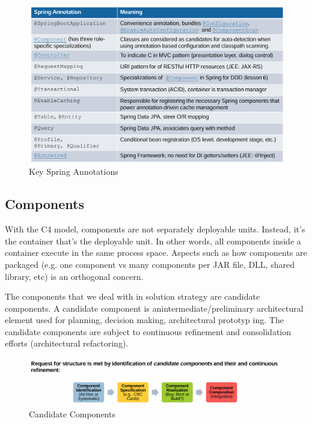 \documentclass[../Main.tex]{subfiles}
\begin{document}
\begin{figure}[H]
    \centering
    \includegraphics[width=1\linewidth]{Images/spring-boot-annotations.png}
    \caption{Key Spring Annotations}
\end{figure}

\subsection{Components}

With the C4 model, components are not separately deployable units.
Instead, it's the container that's the deployable unit. In other words,
all components inside a container execute in the same process space.
Aspects such as how components are packaged (e.g. one component vs
many components per JAR file, DLL, shared library, etc) is an
orthogonal concern.

The components that we deal with in solution strategy are candidate components.
A candidate component is anintermediate/preliminary architectural element
used for planning, decision making, architectural prototyp ing.
The candidate components are subject to continuous refinement and
consolidation efforts (architectural refactoring).

\begin{figure}[H]
    \centering
    \includegraphics[width=1\linewidth]{Images/candidatecomponents.png}
    \caption{Candidate Components}
\end{figure}
\end{document}
